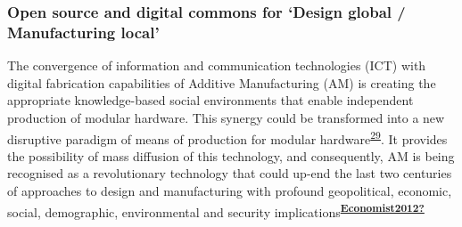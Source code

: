 \documentclass[
  12pt,
  a4paperpaper,
  onecolumn]{article}
\begin{document}
\hypertarget{open-source-and-digital-commons-for-design-global-manufacturing-local}{%
\subsubsection{Open source and digital commons for `Design global /
Manufacturing
local'}\label{open-source-and-digital-commons-for-design-global-manufacturing-local}}

The convergence of information and communication technologies (ICT) with
digital fabrication capabilities of Additive Manufacturing (AM) is
creating the appropriate knowledge-based social environments that enable
independent production of modular hardware. This synergy could be
transformed into a new disruptive paradigm of means of production for
modular
hardware\textsuperscript{\protect\hyperlink{ref-Kostakis2013}{29}}. It
provides the possibility of mass diffusion of this technology, and
consequently, AM is being recognised as a revolutionary technology that
could up-end the last two centuries of approaches to design and
manufacturing with profound geopolitical, economic, social, demographic,
environmental and security
implications\textsuperscript{\protect\hyperlink{ref-Economist2012}{\textbf{Economist2012?}}}
\end{document}
